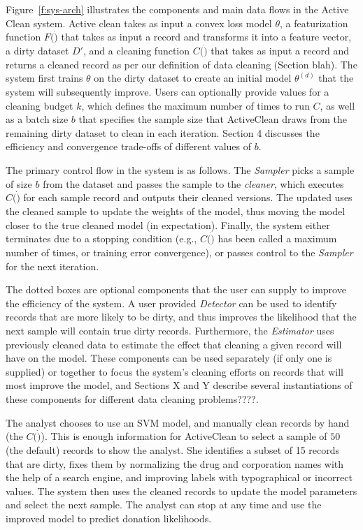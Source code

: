 Figure~\ref{f:sys-arch} illustrates the components and main data flows in the Active Clean system.
Active clean takes as input a convex loss model $\theta$, a featurization function $F(\dot)$ that takes as input a record and 
transforms it into a feature vector, a dirty dataset $D'$, and a cleaning function $C(\dot)$ that takes as input a record and returns a cleaned record as per our 
definition of data cleaning (Section blah).
The system first trains $\theta$ on the dirty dataset to  create an initial model $\theta^(d)$ that the system will subsequently improve.
Users can optionally provide values for a cleaning budget $k$, which defines the maximum number of times to run $C$, as well as
a batch size $b$ that specifies the sample size that ActiveClean draws from the remaining dirty dataset to clean in each iteration.  
Section 4 discusses the efficiency and convergence trade-offs of different values of $b$.

The primary control flow in the system is as follows.  The {\it Sampler} picks a sample of size $b$ from the dataset and passes
the sample to the {\it cleaner}, which executes $C(\dot)$ for each sample record and outputs their cleaned versions.
The updated uses the cleaned sample to update the weights of the model, thus moving the model closer to the true cleaned model (in expectation).
Finally, the system either terminates due to a stopping condition (e.g., $C(\dot)$ has been called a maximum number of times, or training error convergence),
or passes control to the {\it Sampler} for the next iteration.

The dotted boxes are optional components that the user can supply to improve the efficiency of the system.  
A user provided {\it Detector} can be used to identify records that are more likely to be dirty, and  thus 
improves the likelihood that the next sample will contain true dirty records.
Furthermore, the {\it Estimator} uses previously cleaned data to estimate the effect that cleaning a given record will have on the model.
These components can be used separately (if only one is supplied) or together to focus the system's cleaning efforts on records that will most improve the model,
and Sections X and Y describe several instantiations of these components for different data cleaning problems????.

\begin{example}\label{archex1}
The analyst chooses to use an SVM model, and manually clean records by hand (the $C(\dot)$).  
This is enough information for ActiveClean to select a sample of $50$ (the default) records to show the analyst.
She identifies a subset of 15 records that are dirty, fixes them by normalizing the drug and corporation names with the help of a search engine, and improving labels with typographical or incorrect values.
The system then uses the cleaned records to update the model parameters and select the next sample.
The analyst can stop at any time and use the improved model to predict donation likelihoods.
\end{example}


